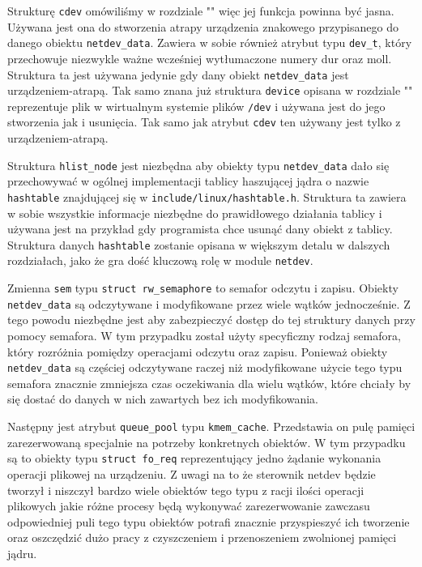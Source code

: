 \documentclass[10pt]{article}
\begin{document}
Strukturę \texttt{cdev} omówiliśmy w rozdziale "" więc jej funkcja powinna być jasna. Używana jest ona do stworzenia atrapy urządzenia znakowego przypisanego do danego obiektu \texttt{netdev\_data}. Zawiera w sobie również atrybut typu \texttt{dev\_t}, który przechowuje niezwykle ważne wcześniej wytłumaczone numery dur oraz moll. Struktura ta jest używana jedynie gdy dany obiekt \texttt{netdev\_data} jest urządzeniem-atrapą. Tak samo znana już struktura \texttt{device} opisana w rozdziale "" reprezentuje plik w wirtualnym systemie plików \texttt{/dev} i używana jest do jego stworzenia jak i usunięcia. Tak samo jak atrybut \texttt{cdev} ten używany jest tylko z urządzeniem-atrapą.

Struktura \texttt{hlist\_node} jest niezbędna aby obiekty typu \texttt{netdev\_data} dało się przechowywać w ogólnej implementacji tablicy haszującej jądra o nazwie \texttt{hashtable} znajdującej się w \texttt{include/linux/hashtable.h}. Struktura ta zawiera w sobie wszystkie informacje niezbędne do prawidłowego działania tablicy i używana jest na przykład gdy programista chce usunąć dany obiekt z tablicy. Struktura danych \texttt{hashtable} zostanie opisana w większym detalu w dalszych rozdziałach, jako że gra dość kluczową rolę w module \texttt{netdev}.

Zmienna \texttt{sem} typu \texttt{struct rw\_semaphore} to semafor odczytu i zapisu. Obiekty \texttt{netdev\_data} są odczytywane i modyfikowane przez wiele wątków jednocześnie. Z tego powodu niezbędne jest aby zabezpieczyć dostęp do tej struktury danych przy pomocy semafora. W tym przypadku został użyty specyficzny rodzaj semafora, który rozróżnia pomiędzy operacjami odczytu oraz zapisu. Ponieważ obiekty \texttt{netdev\_data} są częściej odczytywane raczej niż modyfikowane użycie tego typu semafora znacznie zmniejsza czas oczekiwania dla wielu wątków, które chciały by się dostać do danych w nich zawartych bez ich modyfikowania.

Następny jest atrybut \texttt{queue\_pool} typu \texttt{kmem\_cache}.  Przedstawia on pulę pamięci zarezerwowaną specjalnie na potrzeby konkretnych obiektów. W tym przypadku są to obiekty typu \texttt{struct fo\_req} reprezentujący jedno żądanie wykonania operacji plikowej na urządzeniu. Z uwagi na to że sterownik netdev będzie tworzył i niszczył bardzo wiele obiektów tego typu z racji ilości operacji plikowych jakie różne procesy będą wykonywać zarezerwowanie zawczasu odpowiedniej puli tego typu obiektów potrafi znacznie przyspieszyć ich tworzenie oraz oszczędzić dużo pracy z czyszczeniem i przenoszeniem zwolnionej pamięci jądru.
\end{document}
